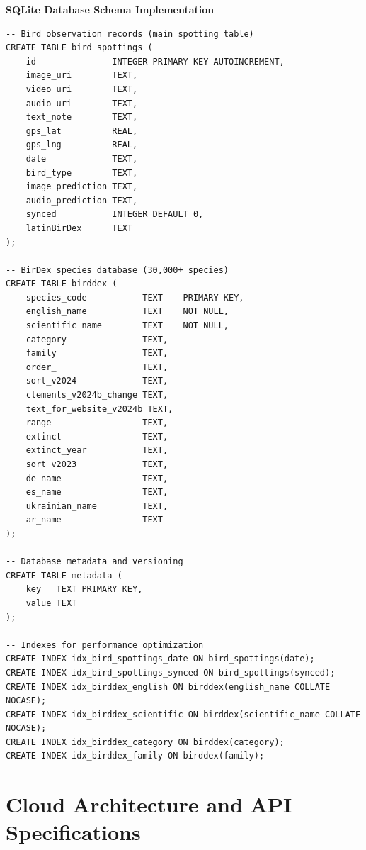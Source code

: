 \textbf{SQLite Database Schema Implementation}
\begin{lstlisting}[caption=Database Schema, label=lst:db_schema]
-- Bird observation records (main spotting table)
CREATE TABLE bird_spottings (
    id               INTEGER PRIMARY KEY AUTOINCREMENT,
    image_uri        TEXT,
    video_uri        TEXT,
    audio_uri        TEXT,
    text_note        TEXT,
    gps_lat          REAL,
    gps_lng          REAL,
    date             TEXT,
    bird_type        TEXT,
    image_prediction TEXT,
    audio_prediction TEXT,
    synced           INTEGER DEFAULT 0,
    latinBirDex      TEXT
);

-- BirDex species database (30,000+ species)
CREATE TABLE birddex (
    species_code           TEXT    PRIMARY KEY,
    english_name           TEXT    NOT NULL,
    scientific_name        TEXT    NOT NULL,
    category               TEXT,
    family                 TEXT,
    order_                 TEXT,
    sort_v2024             TEXT,
    clements_v2024b_change TEXT,
    text_for_website_v2024b TEXT,
    range                  TEXT,
    extinct                TEXT,
    extinct_year           TEXT,
    sort_v2023             TEXT,
    de_name                TEXT,
    es_name                TEXT,
    ukrainian_name         TEXT,
    ar_name                TEXT
);

-- Database metadata and versioning
CREATE TABLE metadata (
    key   TEXT PRIMARY KEY,
    value TEXT
);

-- Indexes for performance optimization
CREATE INDEX idx_bird_spottings_date ON bird_spottings(date);
CREATE INDEX idx_bird_spottings_synced ON bird_spottings(synced);
CREATE INDEX idx_birddex_english ON birddex(english_name COLLATE NOCASE);
CREATE INDEX idx_birddex_scientific ON birddex(scientific_name COLLATE NOCASE);
CREATE INDEX idx_birddex_category ON birddex(category);
CREATE INDEX idx_birddex_family ON birddex(family);
\end{lstlisting}

\section{Cloud Architecture and API Specifications}

